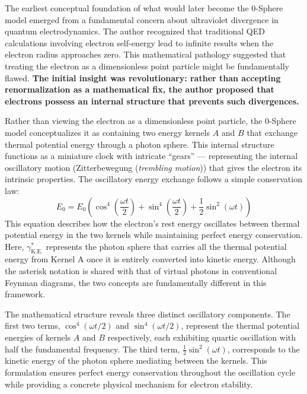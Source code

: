 \documentclass[%
 reprint,
 amsmath,amssymb,
 aps,
]{revtex4-1}
\numberwithin{equation}{section}%
\begin{document}
The earliest conceptual foundation of what would later become the 0-Sphere model emerged from a fundamental concern about ultraviolet divergence in quantum electrodynamics. The author recognized that traditional QED calculations involving electron self-energy lead to infinite results when the electron radius approaches zero. This mathematical pathology suggested that treating the electron as a dimensionless point particle might be fundamentally flawed. \textbf{The initial insight was revolutionary: rather than accepting renormalization as a mathematical fix, the author proposed that electrons possess an internal structure that prevents such divergences.}

Rather than viewing the electron as a dimensionless point particle, the 0-Sphere model conceptualizes it as containing two energy kernels $A$ and $B$ that exchange thermal potential energy through a photon sphere\cite{hanamura2018}. This internal structure functions as a miniature clock with intricate ``gears'' --- representing the internal oscillatory motion (Zitterbewegung (\textit{trembling motion})) that gives the electron its intrinsic properties\cite{schrodinger1930}. The oscillatory energy exchange follows a simple conservation law:
\begin{equation}
E_0 = E_0 \left( \cos^4 \left( \frac{\omega t}{2} \right) + \sin^4 \left( \frac{\omega t}{2} \right) + \frac{1}{2} \sin^2 (\omega t) \right)
\label{eq:energy_conservation}
\end{equation}
This equation describes how the electron's rest energy oscillates between thermal potential energy in the two kernels while maintaining perfect energy conservation. Here, $\gamma^*_{\mathrm{K.E.}}$ represents the photon sphere that carries all the thermal potential energy from Kernel A once it is entirely converted into kinetic energy. Although the asterisk notation is shared with that of virtual photons in conventional Feynman diagrams, the two concepts are fundamentally different in this framework.

The mathematical structure reveals three distinct oscillatory components. The first two terms, $\cos^4(\omega t/2)$ and $\sin^4(\omega t/2)$, represent the thermal potential energies of kernels $A$ and $B$ respectively, each exhibiting quartic oscillation with half the fundamental frequency. The third term, $\frac{1}{2}\sin^2(\omega t)$, corresponds to the kinetic energy of the photon sphere mediating between the kernels. This formulation ensures perfect energy conservation throughout the oscillation cycle while providing a concrete physical mechanism for electron stability.
\end{document}
